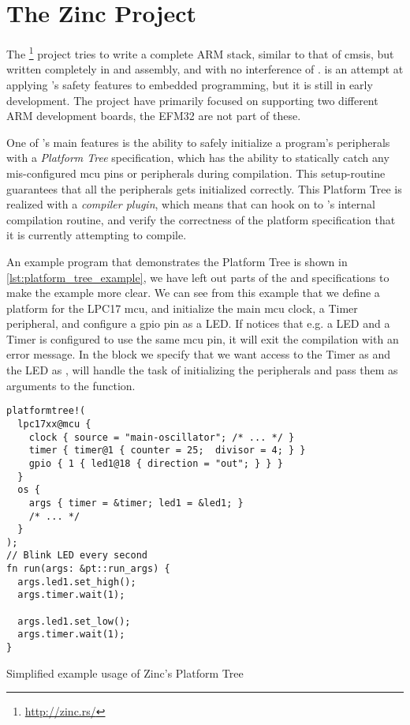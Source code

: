 
\section{The Zinc Project} %
\label{sec:zinc}

The {\zinc} \footnote{\url{http://zinc.rs/}} project tries to write a complete ARM stack, similar to that of \gls{cmsis}, but written completely in {\rust} and assembly, and with no interference of {\C}.
{\zinc} is an attempt at applying {\rust}'s safety features to embedded programming, but it is still in early development.
The project have primarily focused on supporting two different ARM development boards, the EFM32 are not part of these.

One of {\zinc}'s main features is the ability to safely initialize a program's peripherals with a \emph{Platform Tree} specification, which has the ability to statically catch any mis-configured \gls{mcu} pins or peripherals during compilation.
This setup-routine guarantees that all the peripherals gets initialized correctly.
This Platform Tree is realized with a {\rust} \emph{compiler plugin}, which means that {\zinc} can hook on to {\rustc}'s internal compilation routine, and verify the correctness of the platform specification that it is currently attempting to compile.

An example program that demonstrates the Platform Tree is shown in \autoref{lst:platform_tree_example}, we have left out parts of the  and  specifications to make the example more clear.
We can see from this example that we define a platform for the LPC17 \gls{mcu}, and initialize the main \gls{mcu} clock, a Timer peripheral, and configure a \gls{gpio} pin as a LED.
If {\zinc} notices that e.g. a LED and a Timer is configured to use the same \gls{mcu} pin, it will exit the compilation with an error message.
In the  block we specify that we want access to the Timer as  and the LED as , {\zinc} will handle the task of initializing the peripherals and pass them as arguments to the  function.

\begin{listing}[H]
  \begin{verbatim}
platformtree!(
  lpc17xx@mcu {
    clock { source = "main-oscillator"; /* ... */ }
    timer { timer@1 { counter = 25;  divisor = 4; } }
    gpio { 1 { led1@18 { direction = "out"; } } }
  }
  os {
    args { timer = &timer; led1 = &led1; }
    /* ... */
  }
);
// Blink LED every second
fn run(args: &pt::run_args) {
  args.led1.set_high();
  args.timer.wait(1);

  args.led1.set_low();
  args.timer.wait(1);
}
  \end{verbatim}
  \caption{Simplified example usage of Zinc's Platform Tree}
  \label{lst:platform_tree_example}
\end{listing}

